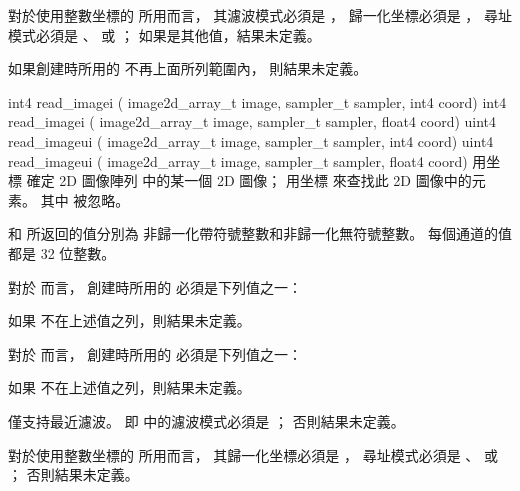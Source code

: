 對於使用整數坐標的  所用而言，
其濾波模式必須是 ，
歸一化坐標必須是 ，
尋址模式必須是 、 
 或 ；
如果是其他值，結果未定義。

如果創建時所用的  不再上面所列範圍內，
則結果未定義。
\stopbuffer

int4 read_imagei (
	image2d_array_t image,
	sampler_t sampler,
	int4 coord)
int4 read_imagei (
	image2d_array_t image,
	sampler_t sampler,
	float4 coord)
uint4 read_imageui (
	image2d_array_t image,
	sampler_t sampler,
	int4 coord)
uint4 read_imageui (
	image2d_array_t image,
	sampler_t sampler,
	float4 coord)
\stopbuffer
{}
用坐標  確定 2D 圖像陣列  中的某一個 2D 圖像；
用坐標  來查找此 2D 圖像中的元素。
其中  被忽略。

 和  所返回的值分別為
非歸一化帶符號整數和非歸一化無符號整數。
每個通道的值都是 32 位整數。

對於  而言，
創建時所用的  必須是下列值之一：
\startigBase[indentnext=no]
\item {}
\item {}
\item {}
\stopigBase
如果  不在上述值之列，則結果未定義。

對於  而言，
創建時所用的  必須是下列值之一：
\startigBase[indentnext=no]
\item {}
\item {}
\item {}
\stopigBase
如果  不在上述值之列，則結果未定義。

 僅支持最近濾波。
即  中的濾波模式必須是 ；
否則結果未定義。

對於使用整數坐標的  所用而言，
其歸一化坐標必須是 ，
尋址模式必須是 、 
 或 ；
否則結果未定義。
\stopbuffer

